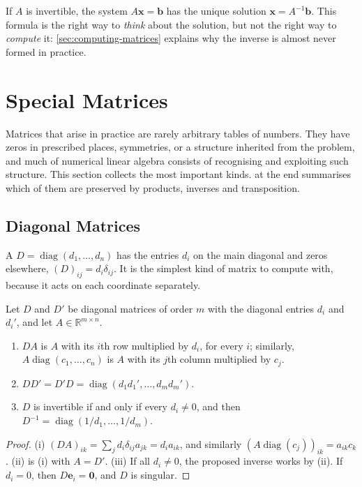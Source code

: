 If $A$ is invertible, the system $A\mathbf x=\mathbf b$ has the unique solution $\mathbf x=A^{-1}\mathbf b$. This formula is the right way to \emph{think} about the solution, but not the right way to \emph{compute} it: \cref{sec:computing-matrices} explains why the inverse is almost never formed in practice.

\section{Special Matrices}
\label{sec:special-matrices}

Matrices that arise in practice are rarely arbitrary tables of numbers. They have zeros in prescribed places, symmetries, or a structure inherited from the problem, and much of numerical linear algebra consists of recognising and exploiting such structure. This section collects the most important kinds.  at the end summarises which of them are preserved by products, inverses and transposition.

\subsection{Diagonal Matrices}

A  $D=\operatorname{diag}(d_1,\ldots,d_n)$ has the entries $d_i$ on the main diagonal and zeros elsewhere, $(D)_{ij}=d_i\delta_{ij}$. It is the simplest kind of matrix to compute with, because it acts on each coordinate separately.

\begin{proposition}
\label{prop:diagonal}
Let $D$ and $D'$ be diagonal matrices of order $m$ with the diagonal entries $d_i$ and $d_i'$, and let $A\in\mathbb R^{m\times n}$.
\begin{enumerate}
\item $DA$ is $A$ with its $i$th row multiplied by $d_i$, for every $i$; similarly, $A\operatorname{diag}(c_1,\ldots,c_n)$ is $A$ with its $j$th column multiplied by $c_j$.
\item $DD'=D'D=\operatorname{diag}(d_1d_1',\ldots,d_md_m')$.
\item $D$ is invertible if and only if every $d_i\ne0$, and then $D^{-1}=\operatorname{diag}(1/d_1,\ldots,1/d_m)$.
\end{enumerate}
\end{proposition}

\begin{proof}
(i) $(DA)_{ik}=\sum_jd_i\delta_{ij}a_{jk}=d_ia_{ik}$, and similarly $(A\operatorname{diag}(c_j))_{ik}=a_{ik}c_k$. (ii) is (i) with $A=D'$. (iii) If all $d_i\ne0$, the proposed inverse works by (ii). If $d_i=0$, then $D\mathbf e_i=\mathbf 0$, and $D$ is singular.
\end{proof}

